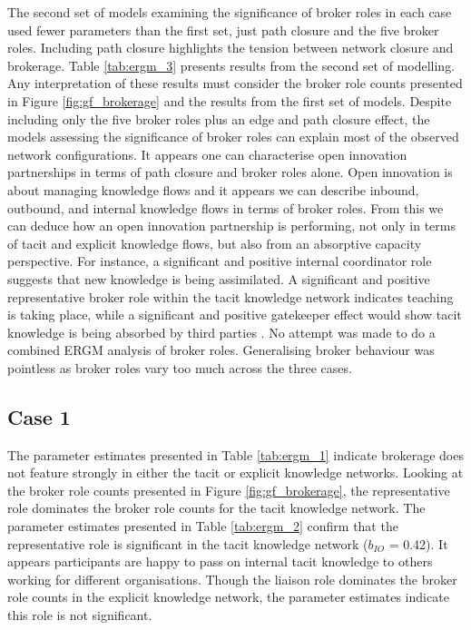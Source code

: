The second set of models examining the significance of broker roles in each case used fewer parameters than the first set, just path closure and the five broker roles. Including path closure highlights the tension between network closure and brokerage. Table \ref{tab:ergm_3} presents results from the second set of modelling. Any interpretation of these results must consider the broker role counts presented in Figure \ref{fig:gf_brokerage} and the results from the first set of models. Despite including only the five broker roles plus an edge and path closure effect, the models assessing the significance of broker roles can explain most of the observed network configurations. It appears one can characterise open innovation partnerships in terms of path closure and broker roles alone. Open innovation is about managing knowledge flows and it appears we can describe inbound, outbound, and internal knowledge flows in terms of broker roles. From this we can deduce how an open innovation partnership is performing, not only in terms of tacit and explicit knowledge flows, but also from an absorptive capacity perspective. For instance, a significant and positive internal coordinator role suggests that new knowledge is being assimilated. A significant and positive representative broker role within the tacit knowledge network indicates teaching is taking place, while a significant and positive gatekeeper effect would show tacit knowledge is being absorbed by third parties \citep{zahra2002absorptive, szulanski2016overcoming}. No attempt was made to do a combined ERGM analysis of broker roles. Generalising broker behaviour was pointless as broker roles vary too much across the three cases. 

\subsection{Case 1}

The parameter estimates presented in Table \ref{tab:ergm_1} indicate brokerage does not feature strongly in either the tacit or explicit knowledge networks. Looking at the broker role counts presented in Figure \ref{fig:gf_brokerage}, the representative role dominates the broker role counts for the tacit knowledge network. The parameter estimates presented in Table \ref{tab:ergm_2} confirm that the representative role is significant in the tacit knowledge network ($b_{IO}$ = 0.42). It appears participants are happy to pass on internal tacit knowledge to others working for different organisations. Though the liaison role dominates the broker role counts in the explicit knowledge network, the parameter estimates indicate this role is not significant. \medskip

